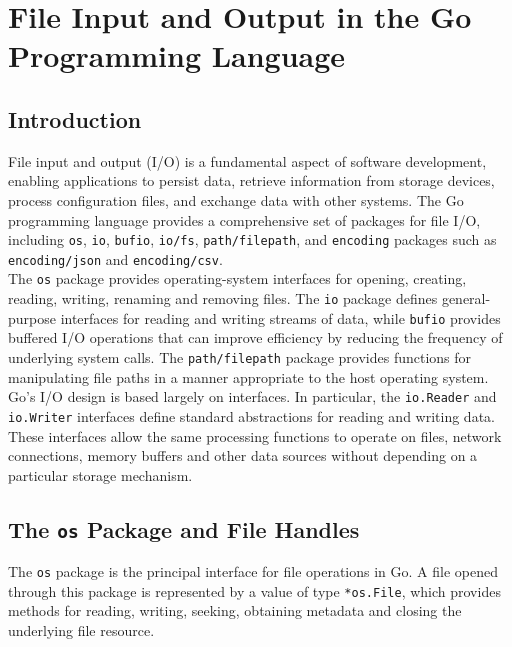\section{File Input and Output in the Go Programming Language}

\subsection{Introduction}

File input and output (I/O) is a fundamental aspect of software development, enabling applications to persist data, retrieve information from storage devices, process configuration files, and exchange data with other systems. The Go programming language provides a comprehensive set of packages for file I/O, including \texttt{os}, \texttt{io}, \texttt{bufio}, \texttt{io/fs}, \texttt{path/filepath}, and \texttt{encoding} packages such as \texttt{encoding/json} and \texttt{encoding/csv}.\\

The \texttt{os} package provides operating-system interfaces for opening, creating, reading, writing, renaming and removing files. The \texttt{io} package defines general-purpose interfaces for reading and writing streams of data, while \texttt{bufio} provides buffered I/O operations that can improve efficiency by reducing the frequency of underlying system calls. The \texttt{path/filepath} package provides functions for manipulating file paths in a manner appropriate to the host operating system.\\

Go's I/O design is based largely on interfaces. In particular, the \texttt{io.Reader} and \texttt{io.Writer} interfaces define standard abstractions for reading and writing data. These interfaces allow the same processing functions to operate on files, network connections, memory buffers and other data sources without depending on a particular storage mechanism.

\subsection{The \texttt{os} Package and File Handles}

The \texttt{os} package is the principal interface for file operations in Go. A file opened through this package is represented by a value of type \texttt{*os.File}, which provides methods for reading, writing, seeking, obtaining metadata and closing the underlying file resource.\\

